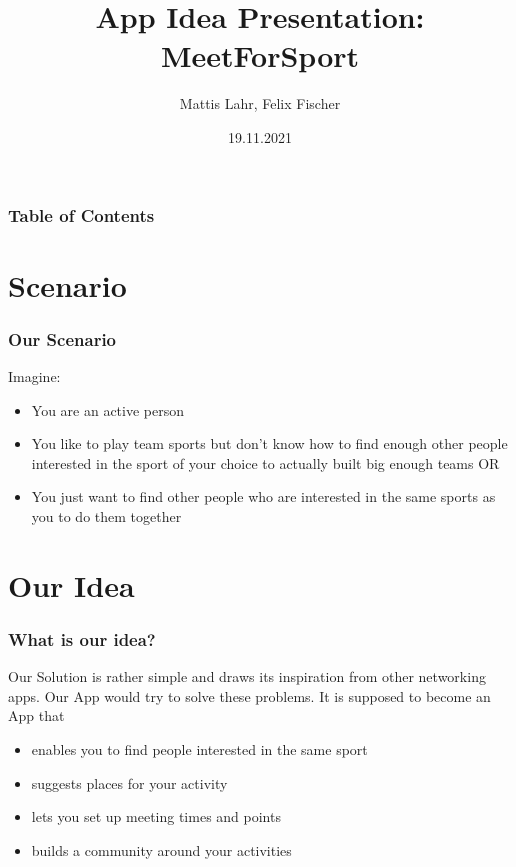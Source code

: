 \documentclass[aspectratio=169]{beamer}
\title{App Idea Presentation: MeetForSport}
\author{Mattis Lahr, Felix Fischer}
\date{19.11.2021}
\begin{document}
\maketitle



\begin{frame}
    \frametitle{Table of Contents}
    \tableofcontents
\end{frame}





\section{Scenario}
\begin{frame}   
\frametitle{Our Scenario}
Imagine:
    \begin{itemize}	
	 	\item You are an active person
	 	\item You like to play team sports but don’t know how to find enough other people interested in the sport of your choice to actually built big enough teams OR
	 	\item You just want to find other people who are interested in the same sports as you to do them together
    \end{itemize}
\end{frame}




\section{Our Idea}
\begin{frame}   
\frametitle{What is our idea?}
Our Solution is rather simple and draws its inspiration from other networking apps.
Our App would try to solve these problems. It is supposed to become an App that
    \begin{itemize}	
		\item enables you to find people interested in the same sport
	 	\item suggests places for your activity 
	 	\item lets you set up meeting times and points
	 	\item builds a community around your activities 
    \end{itemize}
\end{frame}
\end{document}

